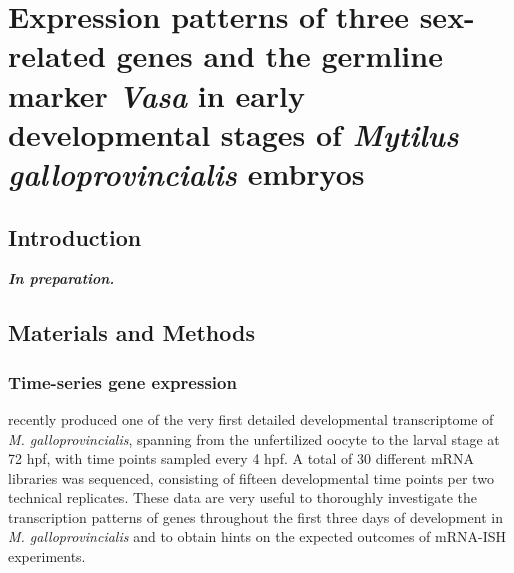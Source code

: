 
% 

{
\chapter{Expression patterns of three sex-related genes and the germline marker \textit{Vasa} in early developmental stages of \textit{Mytilus galloprovincialis} embryos}
\label{inSitu}


\vspace{5mm}




\vspace{5mm}

}

\newpage

\section{Introduction} \label{chapter4_introduction}

\textbf{\textit{In preparation.}}

\section{Materials and Methods} \label{chapter4_MM}
\subsection{Time-series gene expression} \label{chapter4_MM_rnaseq}
\textbf{\cite{miglioli2024hcrMytilus}} recently produced one of the very first detailed developmental transcriptome of \textit{M. galloprovincialis}, spanning from the unfertilized oocyte to the larval stage at 72 hpf, with time points sampled every 4 hpf. A total of 30 different mRNA libraries was sequenced, consisting of fifteen developmental time points per two technical replicates. These data are very useful to thoroughly investigate the transcription patterns of genes throughout the first three days of development in \textit{M. galloprovincialis} and to obtain hints on the expected outcomes of mRNA-ISH experiments.


